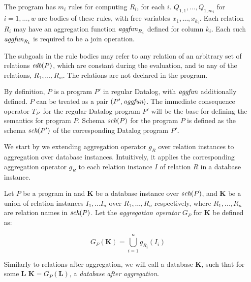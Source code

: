 The program has $m_i$ rules for computing $R_i$, for each $i$. $Q_{1, 1}, \dots, Q_{1, m_i}$ for $i = 1, \dots, w$ are bodies of these rules, with free variables $x_1, \dots, x_{k_i}$. Each relation $R_i$ may have an aggregation function $\textit{aggfun}_{R_i}$ defined for column $k_i$. Each such $\textit{aggfun}_{R_i}$ is required to be a join operation.

The subgoals in the rule bodies may refer to any relation of an arbitrary set of \edb relations $\textit{edb}(P)$, which are constant during the evaluation, and to any of the \idb relations, $R_1, \dots, R_w$. The \edb relations are not declared in the program.

By definition, $P$ is a program $P'$ in regular Datalog, with  $\textit{aggfun}$ additionally defined. $P$ can be treated as a pair $(P', \textit{aggfun})$. The immediate consequence operator $T_{P'}$ for the regular Datalog program $P'$ will be the base for defining the semantics for \datalogra program $P$. Schema $\textit{sch}(P)$ for the \datalogra program $P$ is defined as the schema $\textit{sch}(P')$ of the corresponding Datalog program $P'$.

We start by we extending aggregation operator $g_R$ over relation instances to aggregation over database instances. Intuitively, it applies the corresponding aggregation operator $g_R$ to each relation instance $I$ of relation $R$ in a database instance.

\begin{defn}
Let $P$ be a program in \datalogra and $\textbf{K}$ be a database instance over $\textit{sch}(P)$, and $\textbf{K}$ be a union of relation instances $I_1, \dots I_n$ over $R_1, \dots, R_n$ respectively, where $R_1, \dots, R_n$ are relation names in $\textit{sch}(P)$.
Let the \emph{aggregation operator} $G_P$ for $\textbf{K}$ be defined as:

$$G_P(\textbf{K}) = \bigcup_{i = 1}^n g_{R_i}(I_i)$$
\end{defn}

Similarly to relations after aggregation, we will call a database $\textbf{K}$, such that for some $\textbf{L}$ $\textbf{K} = G_P(\textbf{L})$, a \emph{database after aggregation}.

